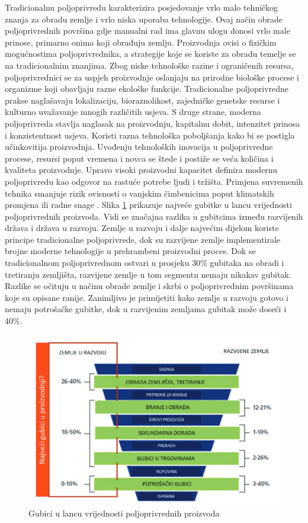 Tradicionalnu poljoprivredu karakterizira posjedovanje vrlo malo tehničkog znanja za obradu zemlje i vrlo niska uporaba tehnologije. Ovaj način obrade poljoprivrednih površina gdje manualni rad ima glavnu ulogu donosi vrlo male prinose, primarno onima koji obrađuju zemlju. Proizvodnja ovisi o fizičkim mogućnostima poljoprivrednika, a strategije koje se koriste za obradu temelje se na tradicionalnim znanjima. Zbog niske tehnološke razine i ograničenih resursa, poljoprivrednici se za uspjeh proizvodnje oslanjaju na prirodne biološke procese i organizme koji obavljaju razne ekološke funkcije. Tradicionalne poljoprivredne prakse naglašavaju lokalizaciju, bioraznolikost, zajedničke genetske resurse i kulturno uvažavanje mnogih različitih usjeva. S druge strane, moderna poljoprivreda stavlja naglasak na proizvodnju, kapitalnu dobit, intenzitet prinosa i konzistentnost usjeva. Koristi razna tehnološka poboljšanja kako bi se postigla učinkovitija proizvodnja. Uvođenju tehnoloških inovacija u poljoprivredne procese, resursi poput vremena i novca se štede i postiže se veća količina i kvaliteta proizvodnje. Upravo visoki proizvodni kapacitet definira modernu poljoprivredu kao odgovor na rastuće potrebe ljudi i tržišta. Primjena suvremenih tehnika smanjuje rizik ovisnosti o vanjskim čimbenicima poput klimatskih promjena ili radne snage \cite{trad_poljo}. Slika \ref{fig:food_loss} prikazuje najveće gubitke u lancu vrijednosti poljoprivrednih proizvoda. Vidi se značajna razlika u gubitcima između razvijenih država i država u razvoju. Zemlje u razvoju i dalje najvećim dijelom koriste principe tradicionalne poljoprivrede, dok su razvijene zemlje implementirale brojne moderne tehnologije u prehrambeni proizvodni proces. Dok se tradicionalnom poljoprivrednom ostvari u prosjeku 30\% gubitaka na obradi i tretiranju zemljišta, razvijene zemlje u tom segmentu nemaju nikakav gubitak. Razlike se očituju u načinu obrade zemlje i skrbi o poljoprivrednim površinama koje su opisane ranije. Zanimljivo je primijetiti kako zemlje u razvoju gotovo i nemaju potrošačke gubitke, dok u razvijenim zemljama gubitak može doseći i 40\%. 

\begin{figure}[ht]
	\includegraphics[width=\linewidth]{imgs/food_loss}
	\caption{Gubici u lancu vrijednosti poljoprivrednih proizvoda \cite{bih_study}}
	\label{fig:food_loss}
\end{figure}

